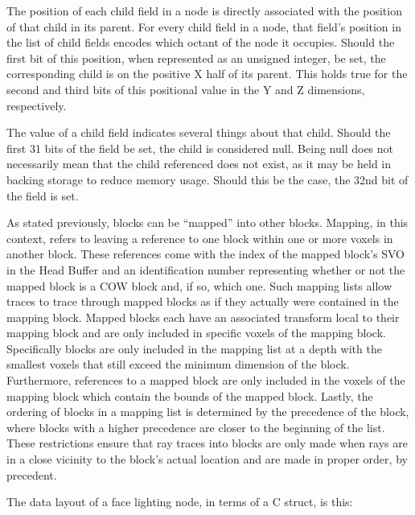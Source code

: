 \documentclass[onecolumn, draftclsnofoot,10pt, compsoc]{IEEEtran}
\newcounter{threesection}[subsubsection]
\newcounter{foursection}[threesection]
\begin{document}

The position of each child field in a node is directly associated with the position of that child in its parent. For every child field in a node, that field’s position in the list of child fields encodes which octant of the node it occupies. Should the first bit of this position, when represented as an unsigned integer, be set, the corresponding child is on the positive X half of its parent. This holds true for the second and third bits of this positional value in the Y and Z dimensions, respectively. 

The value of a child field indicates several things about that child. Should the first 31 bits of the field be set, the child is considered null. Being null does not necessarily mean that the child referenced does not exist, as it may be held in backing storage to reduce memory usage. Should this be the case, the 32nd bit of the field is set.


As stated previously, blocks can be “mapped” into other blocks. Mapping, in this context, refers to leaving a reference to one block within one or more voxels in another block. These references come with the index of the mapped block’s SVO in the Head Buffer and an identification number representing whether or not the mapped block is a COW block and, if so, which one. Such mapping lists allow traces to trace through mapped blocks as if they actually were contained in the mapping block. Mapped blocks each have an associated transform local to their mapping block and are only included in specific voxels of the mapping block. Specifically blocks are only included in the mapping list at a depth with the smallest voxels that still exceed the minimum dimension of the block. Furthermore, references to a mapped block are only included in the voxels of the mapping block which contain the bounds of the mapped block. Lastly, the ordering of blocks in a mapping list is determined by the precedence of the block, where blocks with a higher precedence are closer to the beginning of the list. These restrictions ensure that ray traces into blocks are only made when rays are in a close vicinity to the block’s actual location and are made in proper order, by precedent.

 


The data layout of a face lighting node, in terms of a C struct, is this:
\end{document}

